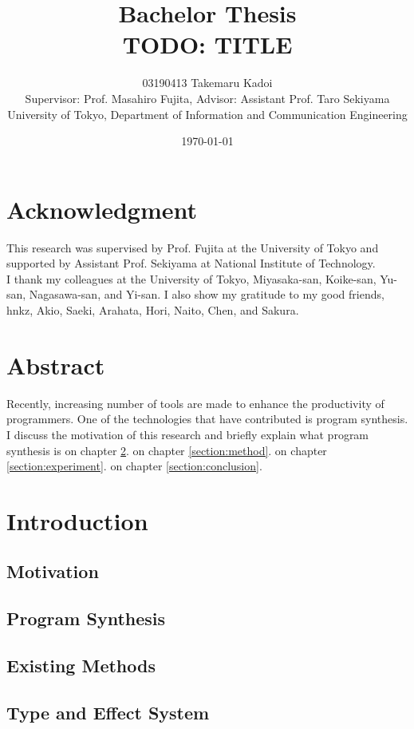 \documentclass[12pt, a4paper, titlepage]{report}
\title{Bachelor Thesis \\ TODO: TITLE}
\author{
  03190413 Takemaru Kadoi
  \\[1cm]
  {\small Supervisor: Prof. Masahiro Fujita},
  {\small Advisor: Assistant Prof. Taro Sekiyama}
  \\[1cm]
  {\small University of Tokyo, Department of Information and Communication Engineering}
}
\date{\today}
\begin{document}


\maketitle
\newpage
\tableofcontents
\newpage

\chapter*{Acknowledgment}
This research was supervised by Prof. Fujita at the University of Tokyo and supported by Assistant Prof. Sekiyama at National Institute of Technology. \\
I thank my colleagues at the University of Tokyo, Miyasaka-san, Koike-san, Yu-san, Nagasawa-san, and Yi-san.
I also show my gratitude to my good friends, hnkz, Akio, Saeki, Arahata, Hori, Naito, Chen, and Sakura.

\chapter{Abstract} %
\label{section:abstract}
Recently, increasing number of tools are made to enhance the productivity of programmers. One of the technologies that have contributed is program synthesis.
I discuss the motivation of this research and briefly explain what program synthesis is on chapter \ref{section:introduction}.
on chapter \ref{section:method}.
on chapter \ref{section:experiment}.
on chapter \ref{section:conclusion}.

\chapter{Introduction}
\label{section:introduction}
  \section{Motivation}
  \section{Program Synthesis}
    \cite{gulwani2017program}
  \section{Existing Methods}
  \section{Type and Effect System}
\end{document}
